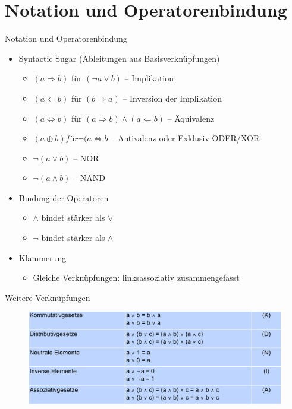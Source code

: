 \documentclass[12pt%
,aspectratio=169%
]{beamer}
\begin{document}
\section{Notation und Operatorenbindung}
\begin{frame}{Notation und Operatorenbindung}
\begin{itemize}
	\item Syntactic Sugar (Ableitungen aus Basisverknüpfungen)
	\begin{itemize}
		\item $(a \Rightarrow b)$ für $(\neg a \lor b)$ -- Implikation
		\item $(a \Leftarrow b)$ für $(b \Rightarrow a)$ -- Inversion der Implikation
		\item $(a \Leftrightarrow b)$ für $(a \Rightarrow b) \land (a \Leftarrow b)$ -- Äquivalenz
		\item $(a \oplus b)  für ¬(a \Leftrightarrow b$ -- Antivalenz oder Exklusiv-ODER/XOR
		\item $\neg(a \lor b)$ -- NOR
		\item $\neg (a \land b)$ -- NAND
	\end{itemize}
	\item Bindung der Operatoren 
	\begin{itemize}
		\item $\land$ bindet stärker als $\lor$
		\item $\neg$ bindet stärker als $\land$
	\end{itemize}
	\item Klammerung
	\begin{itemize}
		\item Gleiche Verknüpfungen: linksassoziativ zusammengefasst
	\end{itemize}
\end{itemize}	 
\end{frame}

\begin{frame}{Weitere Verknüpfungen}
\begin{figure}
\includegraphics[scale=0.325]{pictures/ops1.png}
\end{figure}
\cite{hoffmann2020grundlagen}
\end{frame}
\end{document}
